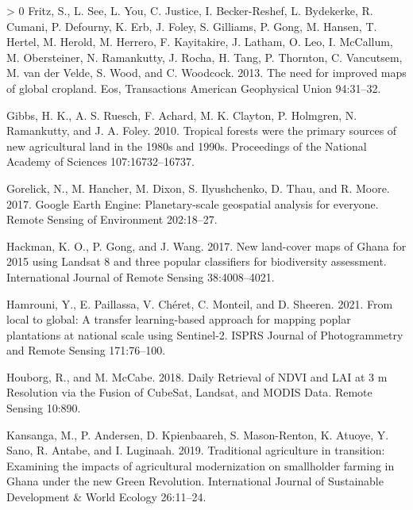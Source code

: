 \documentclass[11pt,a4paper]{article}
\newlength{\cslhangindent}
\newenvironment{CSLReferences}[3] %
 {%
  \setlength{\parindent}{0pt}
  \ifodd #1 \everypar{\setlength{\hangindent}{\cslhangindent}}\ignorespaces\fi
  \ifnum #2 > 0
  \setlength{\parskip}{#2\baselineskip}
  \fi
 }%
 {}
\begin{document}
\begin{CSLReferences}{1}{0}
\leavevmode\hypertarget{ref-Fritzneedimprovedmaps2013}{}%
Fritz, S., L. See, L. You, C. Justice, I. Becker-Reshef, L. Bydekerke,
R. Cumani, P. Defourny, K. Erb, J. Foley, S. Gilliams, P. Gong, M.
Hansen, T. Hertel, M. Herold, M. Herrero, F. Kayitakire, J. Latham, O.
Leo, I. McCallum, M. Obersteiner, N. Ramankutty, J. Rocha, H. Tang, P.
Thornton, C. Vancutsem, M. van der Velde, S. Wood, and C. Woodcock.
2013. The need for improved maps of global cropland. Eos, Transactions
American Geophysical Union 94:31--32.

\leavevmode\hypertarget{ref-GibbsTropicalforestswere2010}{}%
Gibbs, H. K., A. S. Ruesch, F. Achard, M. K. Clayton, P. Holmgren, N.
Ramankutty, and J. A. Foley. 2010. Tropical forests were the primary
sources of new agricultural land in the 1980s and 1990s. Proceedings of
the National Academy of Sciences 107:16732--16737.

\leavevmode\hypertarget{ref-GorelickGoogleEarthEngine2017}{}%
Gorelick, N., M. Hancher, M. Dixon, S. Ilyushchenko, D. Thau, and R.
Moore. 2017. Google {Earth Engine}: Planetary-scale geospatial analysis
for everyone. Remote Sensing of Environment 202:18--27.

\leavevmode\hypertarget{ref-hackmanNewLandcoverMaps2017}{}%
Hackman, K. O., P. Gong, and J. Wang. 2017. New land-cover maps of
{Ghana} for 2015 using {Landsat} 8 and three popular classifiers for
biodiversity assessment. International Journal of Remote Sensing
38:4008--4021.

\leavevmode\hypertarget{ref-hamrouniLocalGlobalTransfer2021}{}%
Hamrouni, Y., E. Paillassa, V. Chéret, C. Monteil, and D. Sheeren. 2021.
From local to global: A transfer learning-based approach for mapping
poplar plantations at national scale using {Sentinel}-2. ISPRS Journal
of Photogrammetry and Remote Sensing 171:76--100.

\leavevmode\hypertarget{ref-HouborgDailyRetrievalNDVI2018}{}%
Houborg, R., and M. McCabe. 2018. Daily {Retrieval} of {NDVI} and {LAI}
at 3 m {Resolution} via the {Fusion} of {CubeSat}, {Landsat}, and {MODIS
Data}. Remote Sensing 10:890.

\leavevmode\hypertarget{ref-KansangaTraditionalagriculturetransition2019}{}%
Kansanga, M., P. Andersen, D. Kpienbaareh, S. Mason-Renton, K. Atuoye,
Y. Sano, R. Antabe, and I. Luginaah. 2019. Traditional agriculture in
transition: Examining the impacts of agricultural modernization on
smallholder farming in {Ghana} under the new {Green Revolution}.
International Journal of Sustainable Development \& World Ecology
26:11--24.


\end{CSLReferences}
\end{document}
